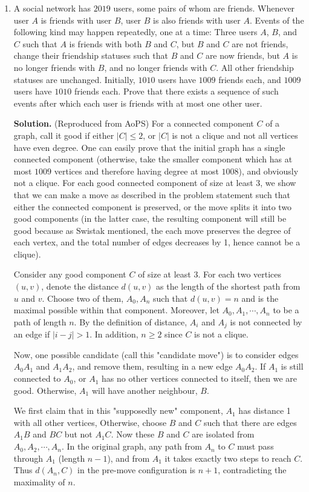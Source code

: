 \documentclass[11pt,a4paper]{article}
\newcommand{\<}{\langle}
\renewcommand{\>}{\rangle}
\begin{document}
\begin{enumerate}
	\item A social network has $2019$ users, some pairs of whom are friends. Whenever user $A$ is friends with user $B$, user $B$ is also friends with user $A$. Events of the following kind may happen repeatedly, one at a time:
	Three users $A$, $B$, and $C$ such that $A$ is friends with both $B$ and $C$, but $B$ and $C$ are not friends, change their friendship statuses such that $B$ and $C$ are now friends, but $A$ is no longer friends with $B$, and no longer friends with $C$. All other friendship statuses are unchanged.
	Initially, $1010$ users have $1009$ friends each, and $1009$ users have $1010$ friends each. Prove that there exists a sequence of such events after which each user is friends with at most one other user.
	
	\textbf{Solution.} (Reproduced from AoPS) For a connected component $C$ of a graph, call it good if either $|C|\le 2$, or $|C|$ is not a clique and not all vertices have even degree. One can easily prove that the initial graph has a single connected component (otherwise, take the smaller component which has at most $1009$ vertices and therefore having degree at most $1008$), and obviously not a clique. For each good connected component of size at least 3, we show that we can make a move as described in the problem statement such that either the connected component is preserved, or the move splits it into two good components (in the latter case, the resulting component will still be good because as Swistak mentioned, the each move preserves the degree of each vertex, and the total number of edges decreases by 1, hence cannot be a clique).
	
	Consider any good component $C$ of size at least 3. For each two vertices $(u, v)$, denote the distance $d(u, v)$ as the length of the shortest path from $u$ and $v$. Choose two of them, $A_0, A_n$ such that $d(u, v)=n$ and is the maximal possible within that component. Moreover, let $A_0, A_1, \cdots , A_n$ to be a path of length $n$. By the definition of distance, $A_i$ and $A_j$ is not connected by an edge if $|i-j|>1$. In addition, $n\ge 2$ since $C$ is not a clique.
	
	Now, one possible candidate (call this "candidate move") is to consider edges $A_0A_1$ and $A_1A_2$, and remove them, resulting in a new edge $A_0A_2$. If $A_1$ is still connected to $A_0$, or $A_1$ has no other vertices connected to itself, then we are good. Otherwise, $A_1$ will have another neighbour, $B$.
	
	We first claim that in this "supposedly new" component, $A_1$ has distance 1 with all other vertices, Otherwise, choose $B$ and $C$ such that there are edges $A_1B$ and $BC$ but not $A_1C$. Now these $B$ and $C$ are isolated from $A_0, A_2, \cdots , A_n$. In the original graph, any path from $A_n$ to $C$ must pass through $A_1$ (length $n-1$), and from $A_1$ it takes exactly two steps to reach $C$. Thus $d(A_n, C)$ in the pre-move configuration is $n+1$, contradicting the maximality of $n$.
	

\end{enumerate}
\end{document}
